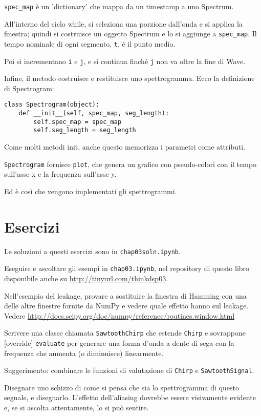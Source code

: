 \documentclass[12pt]{book} \usepackage[width=5.5in,height=8.5in, hmarginratio=3:2,vmarginratio=1:1]{geometry}
\begin{document}
\verb"spec_map" è un 'dictionary' che mappa da un timestamp a uno Spectrum.

All'interno del ciclo while, si seleziona una porzione dall'onda e si applica la finestra; quindi si costruisce un oggetto Spectrum e lo si aggiunge a \verb"spec_map". Il tempo nominale di ogni segmento, {\tt t}, è il punto medio.

Poi si incrementano {\tt i} e {\tt j}, e si continua finché {\tt j} non va oltre la fine di Wave.

Infine, il metodo costruisce e restituisce uno spettrogramma. Ecco la definizione di Spectrogram:

\begin{verbatim} 
class Spectrogram(object):
    def __init__(self, spec_map, seg_length):
        self.spec_map = spec_map
        self.seg_length = seg_length
 \end{verbatim} 

Come molti metodi init, anche questo memorizza i parametri come attributi.

{\tt Spectrogram} fornisce {\tt plot}, che genera un grafico con pseudo-colori con il tempo sull'asse x e la frequenza sull'asse y.

Ed è così che vengono implementati gli spettrogrammi.

\section{Esercizi} 

Le soluzioni a questi esercizi sono in {\tt chap03soln.ipynb}.

\begin{exercise} Eseguire e ascoltare gli esempi in {\tt chap03.ipynb}, nel repository di questo libro disponibile anche su \url{http://tinyurl.com/thinkdsp03}.

Nell'esempio del leakage, provare a sostituire la finestra di Hamming con una delle altre finestre fornite da NumPy e vedere quale effetto hanno sul leakage. Vedere \url{http://docs.scipy.org/doc/numpy/reference/routines.window.html} \end{exercise} 

\begin{exercise} Scrivere una classe chiamata {\tt SawtoothChirp} che estende {\tt Chirp} e sovrappone [override] {\tt evaluate} per generare una forma d'onda a dente di sega con la frequenza che aumenta (o diminuisce) linearmente.

Suggerimento: combinare le funzioni di valutazione di {\tt Chirp} e {\tt SawtoothSignal}.

Disegnare uno schizzo di come si pensa che sia lo spettrogramma di questo segnale, e disegnarlo. L'effetto dell'aliasing dovrebbe essere visivamente evidente e, se si ascolta attentamente, lo si può sentire. \end{exercise} 
\end{document}

